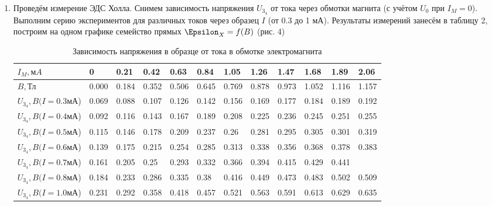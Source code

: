 \documentclass[a4paper]{article}
\begin{document}
\begin{enumerate}
    \item Проведём измерение ЭДС Холла. Снимем зависимость напряжения $U_3_4$ от тока через обмотки магнита (с учётом $U_0$ при $I_M = 0$). Выполним серию экспериментов для различных токов через образец $I$ (от 0.3 до 1 мА). Результаты измерений занесём в таблицу 2, построим на одном графике семейство прямых $\Epsilon_X = f(B)$ (рис. 4)
    
    \begin{table}[h]
    \centering
    \begin{center}
    \caption{Зависимость напряжения в образце от тока в обмотке электромагнита}
    \end{center}
    \vspace{0.1cm}
    \label{tab:my_label}
    \begin{tabular}{ |p{3cm}||p{0.7cm}|p{0.7cm}|p{0.7cm}|p{0.7cm}|p{0.7cm}|p{0.7cm}|p{0.7cm}|p{0.7cm}|p{0.7cm}|p{0.7cm}|p{0.7cm}|  }
 \hline
$I_M, мA$ & 0 & 0.21 & 0.42 & 0.63 & 0.84 & 1.05 & 1.26 & 1.47 & 1.68 & 1.89 & 2.06\\
 \hline
 $B, $Тл & 0.000 & 0.184 & 0.352 & 0.506 & 0.645 & 0.769 & 0.878 & 0.973 & 1.052 & 1.116 & 1.157\\
 \hline
 \hline
$U_3_4, B (I = 0.3$мА) & 0.069 & 0.088 & 0.107 & 0.126 & 0.142 & 0.156 & 0.169 & 0.177 & 0.184 & 0.189 & 0.192\\
\hline
$U_3_4, B (I = 0.4$мА) & 0.092 & 0.116 & 0.143 & 0.167 & 0.189 & 0.208 & 0.225 & 0.236 & 0.245 & 0.251 & 0.255\\
\hline
$U_3_4, B (I = 0.5$мА) & 0.115 & 0.146 & 0.178 & 0.209 & 0.237 & 0.26 & 0.281 & 0.295 & 0.305 & 0.301 & 0.319\\
\hline
$U_3_4, B (I = 0.6$мА) & 0.139 & 0.175 & 0.215 & 0.254 & 0.285 & 0.313 & 0.338 & 0.356 & 0.368 & 0.378 & 0.383\\
\hline
$U_3_4, B (I = 0.7$мА) & 0.161 & 0.205 & 0.25 & 0.293 & 0.332 & 0.366 & 0.394 & 0.415 & 0.429 & 0.441  &  \\
\hline
$U_3_4, B (I = 0.8$мА) & 0.184 & 0.233 & 0.286 & 0.335 & 0.38 & 0.416 & 0.449 & 0.473 & 0.483 & 0.502 & 0.509\\
\hline
$U_3_4, B (I = 1.0$мА) & 0.231 & 0.292 & 0.358 & 0.418 & 0.457 & 0.521 & 0.563 & 0.591 & 0.613 & 0.629 & 0.635\\
\hline
\hline

 \end{tabular}
\end{table}


\end{enumerate}
\end{document}
